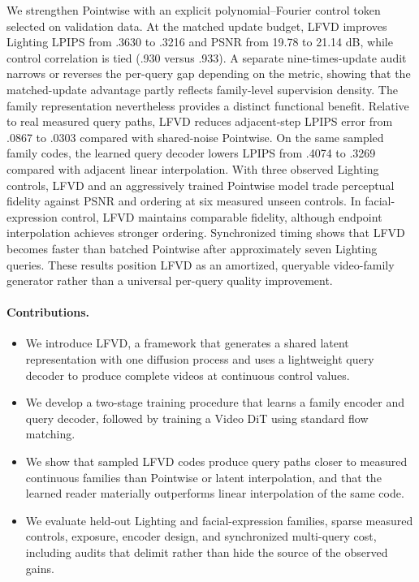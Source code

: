 We strengthen Pointwise with an explicit polynomial--Fourier control token
selected on validation data. At the matched update budget, LFVD improves
Lighting LPIPS from .3630 to .3216 and PSNR from 19.78 to 21.14 dB, while
control correlation is tied (.930 versus .933). A separate nine-times-update
audit narrows or reverses the per-query gap depending on the metric, showing
that the matched-update advantage partly reflects family-level supervision
density. The family representation nevertheless provides a distinct
functional benefit. Relative to real measured query paths, LFVD reduces
adjacent-step LPIPS error from .0867 to .0303 compared with shared-noise
Pointwise. On the same sampled family codes, the learned query decoder lowers
LPIPS from .4074 to .3269 compared with adjacent linear interpolation. With
three observed Lighting controls, LFVD and an aggressively trained Pointwise
model trade perceptual fidelity against PSNR and ordering at six measured
unseen controls. In facial-expression control, LFVD maintains comparable
fidelity, although endpoint interpolation achieves stronger ordering.
Synchronized timing shows that LFVD becomes faster than batched Pointwise
after approximately seven Lighting queries. These results position LFVD as
an amortized, queryable video-family generator rather than a universal
per-query quality improvement.
\paragraph{Contributions.}
\begin{itemize}
    \item We introduce LFVD, a framework that generates a shared latent
    representation with one diffusion process and uses a lightweight
    query decoder to produce complete videos at continuous control values.
    \item We develop a two-stage training procedure that learns a family
    encoder and query decoder, followed by training a Video DiT using
    standard flow matching.
    \item We show that sampled LFVD codes produce query paths closer to
    measured continuous families than Pointwise or latent interpolation,
    and that the learned reader materially outperforms linear interpolation
    of the same code.
    \item We evaluate held-out Lighting and facial-expression families,
    sparse measured controls, exposure, encoder design, and synchronized
    multi-query cost, including audits that delimit rather than hide the
    source of the observed gains.
\end{itemize}
